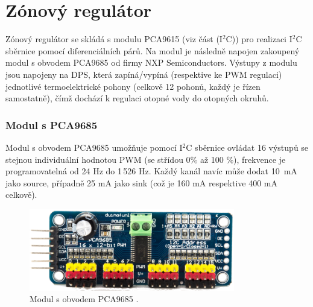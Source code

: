 \section{Zónový regulátor}
Zónový regulátor se skládá s modulu PCA9615 (viz část \label{ses:i2c-sbernice} (I$^2$C)) pro realizaci I$^2$C sběrnice pomocí diferenciálních párů. Na modul je následně napojen zakoupený modul s obvodem PCA9685 od firmy NXP Semiconductors. Výstupy z modulu jsou napojeny na DPS, která zapíná/vypíná (respektive ke PWM regulaci) jednotlivé termoelektrické pohony (celkově 12 pohonů, každý je řízen samostatně), čímž dochází k regulaci otopné vody do otopných okruhů.

\subsubsection{Modul s PCA9685}
Modul s obvodem PCA9685 umožňuje pomocí I$^2$C sběrnice ovládat 16 výstupů se stejnou individuální hodnotou PWM (se střídou 0\% až 100 \%), frekvence je programovatelná od 24 Hz do 1\,526 Hz. Každý kanál navíc může dodat 10~mA jako source, případně 25 mA jako sink (což je 160 mA respektive 400 mA celkově).

\begin{figure}[H]
    \centering
    \includegraphics[width=0.8\textwidth]{images/modul-pca9685-pwm-regulace.png}
    \caption[Modul s obvodem PCA9685.]{Modul s obvodem PCA9685 \cite{modul-pca9685}.}
    \label{fig:modul-pca9685-pwm-regulace}
\end{figure}
